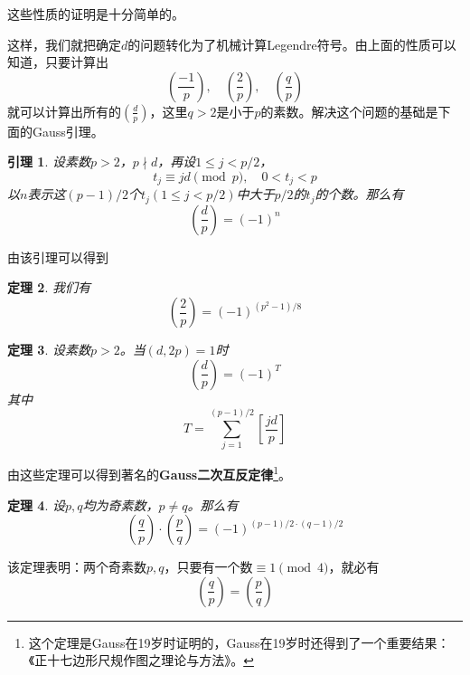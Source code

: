 \documentclass{ctexrep}
\newcommand{\bbold}[1]{\textbf{#1}}
\newtheorem{thrm}{定理}[section]
\newtheorem{lemm}[thrm]{引理}
\begin{document}
这些性质的证明是十分简单的。

这样，我们就把确定$d$的问题转化为了机械计算Legendre符号。由上面的性质可以知道，只要计算出
\begin{displaymath}
\left(\frac{-1}{p}\right),\quad \left(\frac{2}{p}\right),\quad \left(\frac{q}{p}\right)
\end{displaymath}
就可以计算出所有的$\left(\frac{d}{p}\right)$，这里$q>2$是小于$p$的素数。解决这个问题的基础是下面的Gauss引理。

\begin{lemm}
设素数$p>2$，$p\nmid d$，再设$1\leq j<p/2$，
\begin{equation}
t_j\equiv jd\pmod{p},\quad 0<t_j<p
\end{equation}
以$n$表示这$(p-1)/2$个$t_j(1\leq j<p/2)$中大于$p/2$的$t_j$的个数。那么有
\begin{displaymath}
\left(\frac{d}{p}\right)=(-1)^n
\end{displaymath}
\end{lemm}

由该引理可以得到
\begin{thrm}
我们有
\begin{displaymath}
\left(\frac{2}{p}\right)=(-1)^{(p^2-1)/8}
\end{displaymath}
\end{thrm}

\begin{thrm}
设素数$p>2$。当$(d,2p)=1$时
\begin{equation}
\left(\frac{d}{p}\right)=(-1)^T
\end{equation}
其中
\begin{equation}
T=\sum_{j=1}^{(p-1)/2}\left[\frac{jd}{p}\right]
\end{equation}
\end{thrm}

由这些定理可以得到著名的\bbold{Gauss二次互反定律}\footnote{这个定理是Gauss在19岁时证明的，Gauss在19岁时还得到了一个重要结果：《正十七边形尺规作图之理论与方法》。}。

\begin{thrm}
设$p,q$均为奇素数，$p\neq q$。那么有
\begin{equation}
\left(\frac{q}{p}\right)\cdot\left(\frac{p}{q}\right)=(-1)^{(p-1)/2\cdot(q-1)/2}
\end{equation}
\end{thrm}

该定理表明：两个奇素数$p,q$，只要有一个数$\equiv 1\pmod{4}$，就必有
\begin{displaymath}
\left(\frac{q}{p}\right)=\left(\frac{p}{q}\right)
\end{displaymath}
\end{document}
